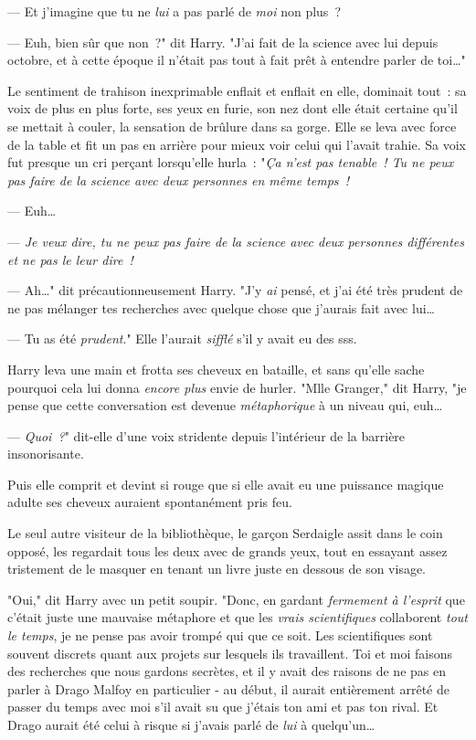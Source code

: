 --- Et j'imagine que tu ne \emph{lui} a pas parlé de \emph{moi} non plus~?

--- Euh, bien sûr que non~?" dit Harry. "J'ai fait de la science avec lui depuis octobre, et à cette époque il n'était pas tout à fait prêt à entendre parler de toi…"

Le sentiment de trahison inexprimable enflait et enflait en elle, dominait tout~: sa voix de plus en plus forte, ses yeux en furie, son nez dont elle était certaine qu'il se mettait à couler, la sensation de brûlure dans sa gorge. Elle se leva avec force de la table et fit un pas en arrière pour mieux voir celui qui l'avait trahie. Sa voix fut presque un cri perçant lorsqu'elle hurla~: "\emph{Ça n'est pas tenable~! Tu ne peux pas faire de la science avec deux personnes en même temps~!}

--- Euh…

--- \emph{Je veux dire, tu ne peux pas faire de la science avec deux personnes différentes et ne pas le leur dire~!}

--- Ah…" dit précautionneusement Harry. "J'y \emph{ai} pensé, et j'ai été très prudent de ne pas mélanger tes recherches avec quelque chose que j'aurais fait avec lui…

--- Tu as été \emph{prudent}." Elle l'aurait \emph{sifflé} s'il y avait eu des sss.

Harry leva une main et frotta ses cheveux en bataille, et sans qu'elle sache pourquoi cela lui donna \emph{encore plus} envie de hurler. "Mlle Granger," dit Harry, "je pense que cette conversation est devenue \emph{métaphorique} à un niveau qui, euh…

--- \emph{Quoi~?}" dit-elle d'une voix stridente depuis l'intérieur de la barrière insonorisante.

Puis elle comprit et devint si rouge que si elle avait eu une puissance magique adulte ses cheveux auraient spontanément pris feu.

Le seul autre visiteur de la bibliothèque, le garçon Serdaigle assit dans le coin opposé, les regardait tous les deux avec de grands yeux, tout en essayant assez tristement de le masquer en tenant un livre juste en dessous de son visage.

"Oui," dit Harry avec un petit soupir. "Donc, en gardant \emph{fermement à l'esprit} que c'était juste une mauvaise métaphore et que les \emph{vrais scientifiques} collaborent \emph{tout le temps}, je ne pense pas avoir trompé qui que ce soit. Les scientifiques sont souvent discrets quant aux projets sur lesquels ils travaillent. Toi et moi faisons des recherches que nous gardons secrètes, et il y avait des raisons de ne pas en parler à Drago Malfoy en particulier - au début, il aurait entièrement arrêté de passer du temps avec moi s'il avait su que j'étais ton ami et pas ton rival. Et Drago aurait été celui à risque si j'avais parlé de \emph{lui} à quelqu'un…

